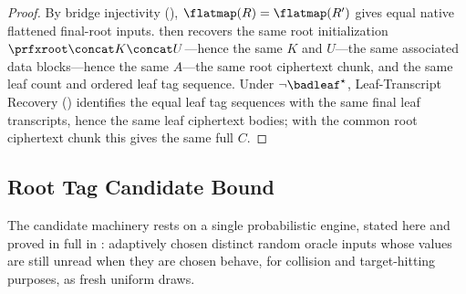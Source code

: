 \begin{proof}
By bridge injectivity (),
$\flatmap(R) = \flatmap(R')$ gives equal native flattened final-root
inputs.  then recovers the same root
initialization $\prfxroot \concat K \concat U$---hence the same $K$ and
$U$---the same associated data blocks---hence the same $A$---the same root
ciphertext chunk, and the same leaf count and ordered leaf tag sequence.
Under $\neg\badleaf^\star$, Leaf-Transcript Recovery
() identifies the equal leaf tag sequences with
the same final leaf transcripts, hence the same leaf ciphertext bodies;
with the common root ciphertext chunk this gives the same full $C$.
\end{proof}

\subsection{Root Tag Candidate Bound}

The candidate machinery rests on a single probabilistic engine, stated
here and proved in full in :
adaptively chosen distinct random oracle inputs whose values are still
unread when they are chosen behave, for collision and target-hitting
purposes, as fresh uniform draws.

